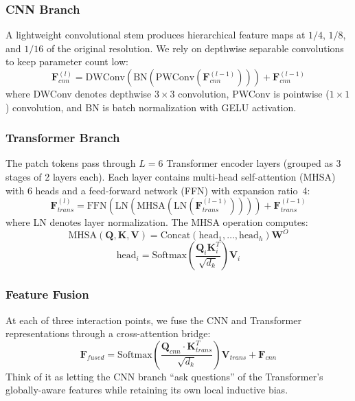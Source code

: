 \documentclass[11pt,a4paper]{article}
\begin{document}
\subsubsection{CNN Branch}
A lightweight convolutional stem produces hierarchical feature maps at $1/4$, $1/8$, and $1/16$ of the original resolution. We rely on depthwise separable convolutions to keep parameter count low:
\begin{equation}
    \mathbf{F}_{cnn}^{(l)} = \text{DWConv}\left(\text{BN}\left(\text{PWConv}\left(\mathbf{F}_{cnn}^{(l-1)}\right)\right)\right) + \mathbf{F}_{cnn}^{(l-1)}
\end{equation}
where DWConv denotes depthwise $3\times3$ convolution, PWConv is pointwise ($1\times1$) convolution, and BN is batch normalization with GELU activation.

\subsubsection{Transformer Branch}
The patch tokens pass through $L = 6$ Transformer encoder layers (grouped as 3 stages of 2 layers each). Each layer contains multi-head self-attention (MHSA) with 6 heads and a feed-forward network (FFN) with expansion ratio~4:
\begin{equation}
    \mathbf{F}_{trans}^{(l)} = \text{FFN}\left(\text{LN}\left(\text{MHSA}\left(\text{LN}\left(\mathbf{F}_{trans}^{(l-1)}\right)\right)\right)\right) + \mathbf{F}_{trans}^{(l-1)}
\end{equation}
where LN denotes layer normalization. The MHSA operation computes:
\begin{equation}
    \text{MHSA}(\mathbf{Q}, \mathbf{K}, \mathbf{V}) = \text{Concat}(\text{head}_1, \ldots, \text{head}_h)\mathbf{W}^O
\end{equation}
\begin{equation}
    \text{head}_i = \text{Softmax}\left(\frac{\mathbf{Q}_i\mathbf{K}_i^T}{\sqrt{d_k}}\right)\mathbf{V}_i
\end{equation}

\subsubsection{Feature Fusion}
At each of three interaction points, we fuse the CNN and Transformer representations through a cross-attention bridge:
\begin{equation}
    \mathbf{F}_{fused} = \text{Softmax}\left(\frac{\mathbf{Q}_{cnn} \cdot \mathbf{K}_{trans}^T}{\sqrt{d_k}}\right)\mathbf{V}_{trans} + \mathbf{F}_{cnn}
\end{equation}
Think of it as letting the CNN branch ``ask questions'' of the Transformer's globally-aware features while retaining its own local inductive bias.
\end{document}
